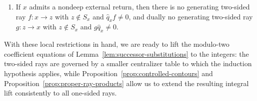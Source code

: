 \begin{proposition}
\begin{enumerate}[label={\upshape(\arabic*)}]
\begin{enumerate}[label={\upshape(\alph*)}]
\[
  r=fa,\quad as=\widehat q_z^2\qquad\text{or}\qquad s=bf,\quad rb=\widehat q_x^2
\]
holds, where $(a,s)$ (respectively, $(r,b)$) is a nondeep external return at $z$ (respectively, at $x$) and $a$ (respectively, $b$) is a generating one-sided ray.
\end{enumerate}
\item If $x$ admits a nondeep external return, then there is no generating two-sided ray $f\colon x\to z$ with $z\notin S_x$ and $\widehat q_xf\ne0$, and dually no generating two-sided ray $g\colon z\to x$ with $z\notin S_x$ and $g\widehat q_x\ne0$.
\end{enumerate}
\end{proposition}

With these local restrictions in hand, we are ready to lift the modulo-two coefficient equations of Lemma~\ref{lem:successor-substitutions} to the integers: the two-sided rays are governed by a smaller centralizer table to which the induction hypothesis applies, while Proposition~\ref{prop:controlled-contours} and Proposition~\ref{prop:proper-ray-products} allow us to extend the resulting integral lift consistently to all one-sided rays.
